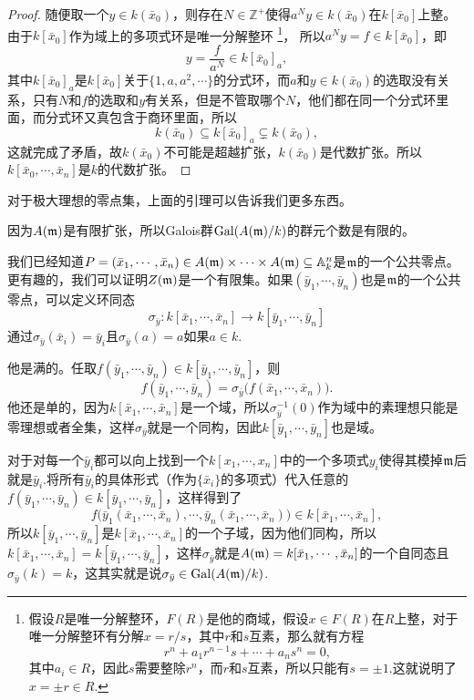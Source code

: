 \documentclass[9pt]{extbook}
\theoremstyle{plain}%
\begin{document}
\begin{proof}
	随便取一个$y\in k(\bar{x}_0)$，则存在$N\in \mathbb{Z}^+$使得$a^Ny\in k(\bar{x}_0)$在$k[\bar{x}_0]$上整。由于$k[\bar{x}_0]$作为域上的多项式环是唯一分解整环
	\footnote{假设$R$是唯一分解整环，$F(R)$是他的商域，假设$x\in F(R)$在$R$上整，对于唯一分解整环有分解$x=r/s$，其中$r$和$s$互素，那么就有方程
	\[
		r^n+a_1r^{n-1}s+\cdots+a_n s^n=0,
	\]
	其中$a_i\in R$，因此$s$需要整除$r^n$，而$r$和$s$互素，所以只能有$s=\pm 1$.这就说明了$x=\pm r\in R$.}，
	所以$a^Ny=f\in k[\bar{x}_0]$，即
	\[
		y=\frac{f}{a^N}\in k[\bar{x}_0]_{a},
	\]
	其中$k[\bar{x}_0]_{a}$是$k[\bar{x}_0]$关于$\{1,a,a^2,\cdots\}$的分式环，而$a$和$y\in  k(\bar{x}_0)$的选取没有关系，只有$N$和$f$的选取和$y$有关系，但是不管取哪个$N$，他们都在同一个分式环里面，而分式环又真包含于商环里面，所以
	\[
		k(\bar{x}_0)\subseteq k[\bar{x}_0]_{a}\subsetneq k(\bar{x}_0),
	\]
	这就完成了矛盾，故$k(\bar{x}_0)$不可能是超越扩张，$k(\bar{x}_0)$是代数扩张。所以$k[\bar{x}_0,\cdots,\bar{x}_{n}]$是$k$的代数扩张。
\end{proof}

对于极大理想的零点集，上面的引理可以告诉我们更多东西。

因为$A(\mathfrak{m})$是有限扩张，所以Galois群$\mathrm{Gal}(A(\mathfrak{m})/k)$的群元个数是有限的。

我们已经知道$P=(\bar{x}_1,\cdots,\bar{x}_n)\in A(\mathfrak{m})\times \cdots\times A(\mathfrak{m})\subseteq \mathbb{A}^n_k$是$\mathfrak{m}$的一个公共零点。更有趣的，我们可以证明$Z(\mathfrak{m})$是一个有限集。如果$(\bar{y}_1,\cdots,\bar{y}_n)$也是$\mathfrak{m}$的一个公共零点，可以定义环同态
\[
	\sigma_{\bar{y}}:k[\bar{x}_1,\cdots,\bar{x}_n]\to k[\bar{y}_1,\cdots,\bar{y}_n]
\]
通过$\sigma_{\bar{y}}(\bar{x}_i)=\bar{y}_i$且$\sigma_{\bar{y}}(a)=a$如果$a\in k$.

他是满的。任取$f(\bar{y}_1,\cdots,\bar{y}_n)\in k[\bar{y}_1,\cdots,\bar{y}_n]$，则
\[
	f(\bar{y}_1,\cdots,\bar{y}_n)=\sigma_{\bar{y}}\bigl(f(\bar{x}_1,\cdots,\bar{x}_n)\bigr).
\]
他还是单的，因为$k[\bar{x}_1,\cdots,\bar{x}_n]$是一个域，所以$\sigma_{\bar{y}}^{-1}(0)$作为域中的素理想只能是零理想或者全集，这样$\sigma_{\bar{y}}$就是一个同构，因此$k[\bar{y}_1,\cdots,\bar{y}_n]$也是域。

对于对每一个$\bar{y}_i$都可以向上找到一个$k[x_1,\cdots,x_n]$中的一个多项式$y_i$使得其模掉$\mathfrak{m}$后就是$\bar{y}_i$.将所有$\bar{y}_i$的具体形式（作为$\{\bar{x}_i\}$的多项式）代入任意的$f(\bar{y}_1,\cdots,\bar{y}_n) \in k[\bar{y}_1,\cdots,\bar{y}_n]$，这样得到了
\[
	f\bigl(\bar{y}_1(\bar{x}_1,\cdots,\bar{x}_n),\cdots,\bar{y}_n(\bar{x}_1,\cdots,\bar{x}_n)\bigr) \in k[\bar{x}_1,\cdots,\bar{x}_n],
\]
所以$k[\bar{y}_1,\cdots,\bar{y}_n]$是$k[\bar{x}_1,\cdots,\bar{x}_n]$的一个子域，因为他们同构，所以$k[\bar{x}_1,\cdots,\bar{x}_n]=k[\bar{y}_1,\cdots,\bar{y}_n]$，这样$\sigma_{\bar{y}}$就是$A(\mathfrak{m})=k[\bar{x}_1,\cdots,\bar{x}_n]$的一个自同态且$\sigma_{\bar{y}}(k)=k$，这其实就是说$\sigma_{\bar{y}}\in \mathrm{Gal}(A(\mathfrak{m})/k)$.
\end{document}

